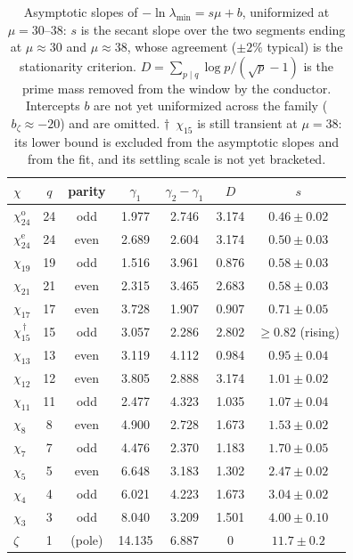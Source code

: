 \documentclass[10pt]{article}
\begin{document}
\begin{table}[h]\centering\small
\begin{tabular}{lcccccc}
\toprule
$\chi$ & $q$ & parity & $\gamma_1$ & $\gamma_2-\gamma_1$ & $D$ & $s$ \\
\midrule
$\chi_{24}^{\mathrm{o}}$ & 24 & odd  & 1.977 & 2.746 & 3.174 & $0.46\pm0.02$ \\
$\chi_{24}^{\mathrm{e}}$ & 24 & even & 2.689 & 2.604 & 3.174 & $0.50\pm0.03$ \\
$\chi_{19}$ & 19 & odd  & 1.516 & 3.961 & 0.876 & $0.58\pm0.03$ \\
$\chi_{21}$ & 21 & even & 2.315 & 3.465 & 2.683 & $0.58\pm0.03$ \\
$\chi_{17}$ & 17 & even & 3.728 & 1.907 & 0.907 & $0.71\pm0.05$ \\
$\chi_{15}^{\,\dagger}$ & 15 & odd  & 3.057 & 2.286 & 2.802 & $\ge0.82$ (rising) \\
$\chi_{13}$ & 13 & even & 3.119 & 4.112 & 0.984 & $0.95\pm0.04$ \\
$\chi_{12}$ & 12 & even & 3.805 & 2.888 & 3.174 & $1.01\pm0.02$ \\
$\chi_{11}$ & 11 & odd  & 2.477 & 4.323 & 1.035 & $1.07\pm0.04$ \\
$\chi_{8}$  & 8  & even & 4.900 & 2.728 & 1.673 & $1.53\pm0.02$ \\
$\chi_{7}$  & 7  & odd  & 4.476 & 2.370 & 1.183 & $1.70\pm0.05$ \\
$\chi_{5}$  & 5  & even & 6.648 & 3.183 & 1.302 & $2.47\pm0.02$ \\
$\chi_{4}$  & 4  & odd  & 6.021 & 4.223 & 1.673 & $3.04\pm0.02$ \\
$\chi_{3}$  & 3  & odd  & 8.040 & 3.209 & 1.501 & $4.00\pm0.10$ \\
$\zeta$     & 1  & (pole) & 14.135 & 6.887 & 0 & $11.7\pm0.2$ \\
\bottomrule
\end{tabular}
\caption{\small Asymptotic slopes of $-\ln\lambda_{\min}=s\mu+b$,
uniformized at $\mu=30$--$38$: $s$ is the secant slope over the two
segments ending at $\mu\approx30$ and $\mu\approx38$, whose agreement
($\pm2\%$ typical) is the stationarity criterion.
$D=\sum_{p\mid q}\log p/(\sqrt p-1)$ is the prime mass removed from
the window by the conductor. Intercepts $b$ are not yet uniformized
across the family ($b_\zeta\approx-20$) and are omitted.
$\dagger$~$\chi_{15}$ is still transient at $\mu=38$: its lower bound
is excluded from the asymptotic slopes and from the fit, and its
settling scale is not yet bracketed.}
\end{table}
\end{document}
